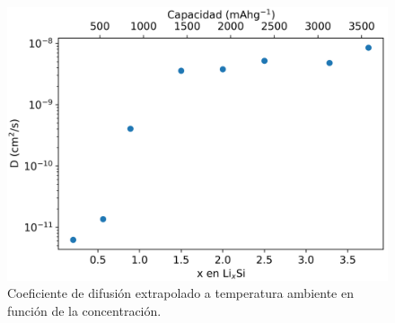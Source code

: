 \begin{figure}[h!]
    \centering
    \includegraphics[width=.7\textwidth]{Silicio/comportamiento/resultados/concentracion/difusion/difusion.png}
    \caption{Coeficiente de difusión extrapolado a temperatura ambiente en función de la concentración.}
    \label{fig:tdifusion}
\end{figure}

